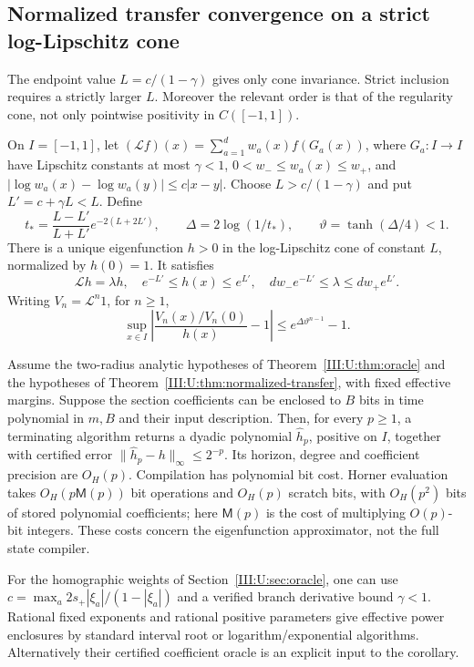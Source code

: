 \subsection{Normalized transfer convergence on a strict log-Lipschitz cone}
\label{III:U:sec:normalized-transfer}
The endpoint value $L=c/(1-\gamma)$ gives
only cone invariance. Strict inclusion requires a strictly larger
$L$. Moreover the relevant order is that of the regularity cone,
not only pointwise positivity in $C([-1,1])$.

\begin{theorem}
\label{III:U:thm:normalized-transfer}
On $I=[-1,1]$, let
$(\mathcal L f)(x)=\sum_{a=1}^d w_a(x)f(G_a(x))$, where
$G_a:I\to I$ have Lipschitz constants at most $\gamma<1$,
$0<w_-\le w_a(x)\le w_+$, and
$|\log w_a(x)-\log w_a(y)|\le c|x-y|$.
Choose $L>c/(1-\gamma)$ and put $L'=c+\gamma L<L$.
Define
\[
 t_* =\frac{L-L'}{L+L'}e^{-2(L+2L')},\qquad
 \Delta=2\log(1/t_*),\qquad \vartheta=\tanh(\Delta/4)<1.
\]
There is a unique eigenfunction $h>0$ in the log-Lipschitz cone of
constant $L$, normalized by $h(0)=1$. It satisfies
\[
 \mathcal L h=\lambda h,\quad
 e^{-L'}\le h(x)\le e^{L'},\quad
 d w_-e^{-L'}\le\lambda\le d w_+e^{L'}.
\]
Writing $V_n=\mathcal L^n1$, for $n\ge1$,
\begin{equation}
 \sup_{x\in I}\left|\frac{V_n(x)/V_n(0)}{h(x)}-1\right|
       \le e^{\Delta\vartheta^{n-1}}-1.
 \label{III:U:eq:normalized-transfer}
\end{equation}
\end{theorem}


\begin{corollary}
\label{III:U:cor:normalized-polynomial}
Assume the two-radius analytic hypotheses of Theorem~\ref{III:U:thm:oracle}
and the hypotheses of Theorem~\ref{III:U:thm:normalized-transfer}, with
fixed effective margins. Suppose the section coefficients can be
enclosed to $B$ bits in time polynomial in $m,B$ and their input
description. Then, for every $p\ge1$, a terminating algorithm returns
a dyadic polynomial $\widehat h_p$, positive on $I$, together with
certified error $\|\widehat h_p-h\|_\infty\le2^{-p}$.
Its horizon, degree and coefficient precision are $O_H(p)$.
Compilation has polynomial bit cost. Horner evaluation takes
$O_H(p\mathsf M(p))$ bit operations and $O_H(p)$ scratch bits,
with $O_H(p^2)$ bits of stored polynomial coefficients; here
$\mathsf M(p)$ is the cost of multiplying $O(p)$-bit integers.
These costs concern the eigenfunction approximator, not the full state compiler.
\end{corollary}

For the homographic weights of Section~\ref{III:U:sec:oracle}, one can use
$c=\max_a 2s_+|\xi_a|/(1-|\xi_a|)$ and a verified branch derivative
bound $\gamma<1$. Rational fixed exponents and rational positive
parameters give effective power enclosures by standard interval
root or logarithm/exponential algorithms. Alternatively their
certified coefficient oracle is an explicit input to the corollary.

